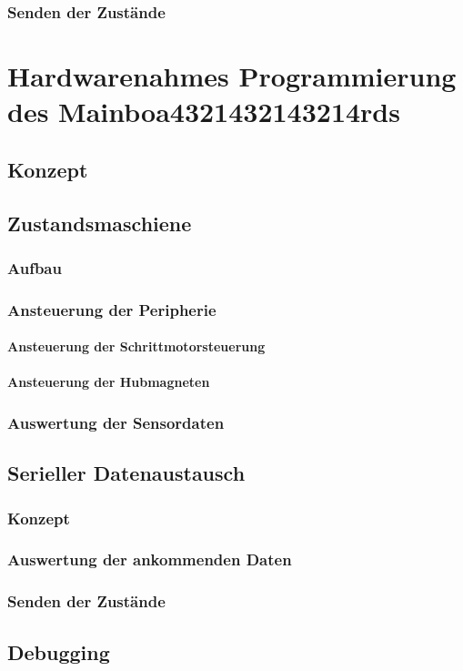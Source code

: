 \subsubsection{Senden der Zustände}





\section{Hardwarenahmes Programmierung des Mainboa4321432143214rds}
\label{sec:board}
\subsection{Konzept}
\subsection{Zustandsmaschiene}
\subsubsection{Aufbau}
\subsubsection{Ansteuerung der Peripherie}
\paragraph{Ansteuerung der Schrittmotorsteuerung}
\paragraph{Ansteuerung der Hubmagneten}
\subsubsection{Auswertung der Sensordaten}

\subsection{Serieller Datenaustausch}
\subsubsection{Konzept}
\subsubsection{Auswertung der ankommenden Daten}
\subsubsection{Senden der Zustände}


\subsection{Debugging}



